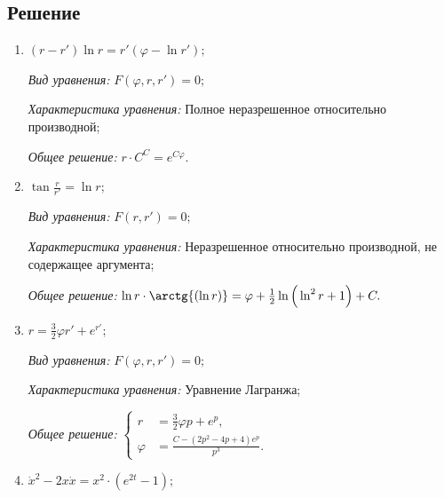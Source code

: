 \documentclass[14pt, a4paper, titlepage, fleqn]{extarticle}
\begin{document}
        \subsection{Решение}
            \begin{enumerate}
                \item \( (r-r') \ln{r} = r' \left( \varphi - \ln{r'} \right); \)
                
                    \textit{Вид уравнения:} \( F \left( \varphi, r, r' \right) = 0; \)

                    \textit{Характеристика уравнения:}
                        Полное неразрешенное относительно производной;

                    \textit{Общее решение:} \( r \cdot C^C = e^{C \varphi}. \)

                \item \( \tan{\frac{r}{r'}} = \ln{r}; \)
                
                    \textit{Вид уравнения:} \( F \left(r, r' \right) = 0; \)

                    \textit{Характеристика уравнения:}
                        Неразрешенное относительно производной, не содержащее аргумента;

                    \textit{Общее решение:} \( \ln{r} \cdot \arctg{\left( \ln r \right)} = \varphi + \frac{1}{2}\ln{\Big(\ln^2{r} + 1\Big)} + C. \)
                

                \item \( r = \frac{3}{2} \varphi r' + e^{r'}; \)
                
                    \textit{Вид уравнения:} \( F \left( \varphi, r, r' \right) = 0; \)

                    \textit{Характеристика уравнения:}
                        Уравнение Лагранжа;

                    \textit{Общее решение:} 
                        \(
                            \left\lbrace
                                \begin{aligned}
                                    r &= \frac{3}{2}\varphi p + e^p, \\
                                    \varphi &= \frac{C - \left( 2p^2 - 4p + 4 \right)e^p}{p^3}.
                                \end{aligned}
                            \right.    
                        \)

                \item \( \dot{x}^2 - 2x \dot{x} = x^2 \cdot \left( e^{2t} - 1 \right); \)
                

\end{enumerate}
\end{document}
